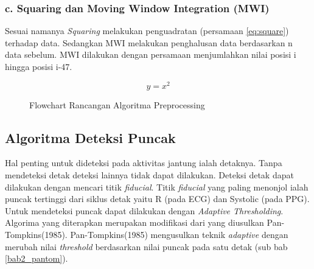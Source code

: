 \subsubsection{c. Squaring dan Moving Window Integration (MWI)}
Sesuai namanya \textit{Squaring} melakukan penguadratan (persamaan \ref{eq:square}) terhadap data. Sedangkan MWI melakukan penghalusan data berdasarkan n data sebelum. MWI dilakukan dengan persamaan menjumlahkan nilai posisi i hingga posisi i-47.

\begin{equation}
y = x^{2}
\label{eq:square}
\end{equation}

\begin{figure}[H]
	\centering
    \caption{Flowchart Rancangan Algoritma Preprocessing}
	\label{flow:fig_preproc_algorithm}
\end{figure}

\subsection{Algoritma Deteksi Puncak}
Hal penting untuk dideteksi pada aktivitas jantung ialah detaknya. Tanpa mendeteksi detak deteksi lainnya tidak dapat dilakukan. Deteksi detak dapat dilakukan dengan mencari titik \textit{fiducial}. Titik \textit{fiducial} yang paling menonjol ialah puncak tertinggi dari siklus detak yaitu R (pada ECG) dan Systolic (pada PPG). Untuk mendeteksi puncak dapat dilakukan dengan \textit{Adaptive Thresholding}. Algorima yang diterapkan merupakan modifikasi dari yang diusulkan Pan-Tompkins(1985). Pan-Tompkins(1985) mengusulkan teknik \textit{adaptive} dengan merubah nilai \textit{threshold} berdasarkan nilai puncak pada satu detak (sub bab \ref{bab2_pantom}). 

